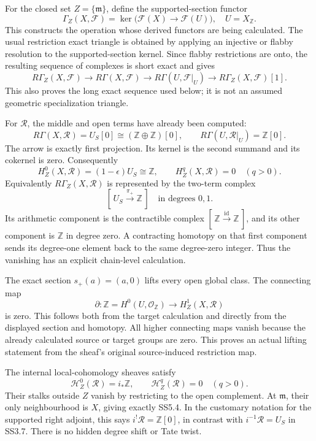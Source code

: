 For the closed set \(Z=\{\mathfrak m\}\), define the supported-section
functor \[
 \Gamma_Z(X,\mathcal F)=
 \ker\bigl(\mathcal F(X)\to\mathcal F(U)\bigr),
\quad U=X_{\mathbb Z}.
\tag{SS5.1}
\] This constructs the operation whose derived functors are being
calculated. The usual restriction exact triangle is obtained by applying
an injective or flabby resolution to the supported-section kernel. Since
flabby restrictions are onto, the resulting sequence of complexes is
short exact and gives \[
 R\Gamma_Z(X,\mathcal F)\longrightarrow
 R\Gamma(X,\mathcal F)\longrightarrow
 R\Gamma(U,\mathcal F|_U)\longrightarrow
 R\Gamma_Z(X,\mathcal F)[1].
\tag{SS5.2}
\] This also proves the long exact sequence used below; it is not an
assumed geometric specialization triangle.

For \(\mathcal R\), the middle and open terms have already been
computed: \[
 R\Gamma(X,\mathcal R)=U_S[0]\cong(\mathbb Z\oplus\mathbb Z)[0],
 \qquad
 R\Gamma(U,\mathcal R|_U)=\mathbb Z[0].
\tag{SS5.3}
\] The arrow is exactly first projection. Its kernel is the second
summand and its cokernel is zero. Consequently \[
 \boxed{
 H_Z^0(X,\mathcal R)=(1-\epsilon)U_S\cong\mathbb Z,\qquad
 H_Z^q(X,\mathcal R)=0\quad(q>0).
 }
\tag{SS5.4}
\] Equivalently \(R\Gamma_Z(X,\mathcal R)\) is represented by the
two-term complex \[
 [\,U_S\xrightarrow{\pi_+}\mathbb Z\,]
\quad\text{in degrees }0,1.
\tag{SS5.5}
\] Its arithmetic component is the contractible complex
\([\,\mathbb Z\xrightarrow{\mathrm{id}}\mathbb Z\,]\), and its other
component is \(\mathbb Z\) in degree zero. A contracting homotopy on
that first component sends its degree-one element back to the same
degree-zero integer. Thus the vanishing has an explicit chain-level
calculation.

The exact section \(s_+(a)=(a,0)\) lifts every open global class. The
connecting map \[
 \partial:\mathbb Z=H^0(U,\mathcal O_{\mathbb Z})
 \longrightarrow H_Z^1(X,\mathcal R)
\] is zero. This follows both from the target calculation and directly
from the displayed section and homotopy. All higher connecting maps
vanish because the already calculated source or target groups are zero.
This proves an actual lifting statement from the sheaf's original
source-induced restriction map.

The internal local-cohomology sheaves satisfy \[
 \mathcal H_Z^0(\mathcal R)=i_*\mathbb Z,\qquad
 \mathcal H_Z^q(\mathcal R)=0\quad(q>0).
\tag{SS5.6}
\] Their stalks outside \(Z\) vanish by restricting to the open
complement. At \(\mathfrak m\), their only neighbourhood is \(X\),
giving exactly SS5.4. In the customary notation for the supported right
adjoint, this says \(i^!\mathcal R=\mathbb Z[0]\), in contrast with
\(i^{-1}\mathcal R=U_S\) in SS3.7. There is no hidden degree shift or
Tate twist.

